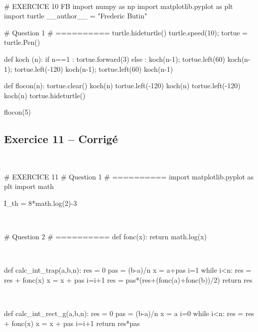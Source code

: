 \documentclass[10pt,fleqn]{article} %
\begin{document}
\begin{corrige}
$\quad$
\begin{python}
# EXERCICE 10 FB
import numpy as np
import matplotlib.pyplot as plt
import turtle
__author__ = "Frederic Butin"

# Question 1 
# ==========
turtle.hideturtle()
turtle.speed(10);
tortue = turtle.Pen()

def koch (n):
    if n==1 : 
        tortue.forward(3)
    else : 
        koch(n-1);
        tortue.left(60)
        koch(n-1);
        tortue.left(-120)
        koch(n-1);
        tortue.left(60)
        koch(n-1)
        

def flocon(n):
    tortue.clear()
    koch(n)
    tortue.left(-120)
    koch(n)
    tortue.left(-120)
    koch(n)
    tortue.hideturtle()

flocon(5)
\end{python}
\end{corrige}



\subsection*{Exercice 11 -- Corrigé}

\begin{corrige}
$\quad$
\begin{python}
# EXERCICE 11
# Question 1 
# ==========
import matplotlib.pyplot as plt
import math

I_th = 8*math.log(2)-3
\end{python}
\end{corrige}

\begin{corrige}
$\quad$
\begin{python}
# Question 2
# ==========
def fonc(x):
    return math.log(x)
\end{python}
\end{corrige}


\begin{corrige}
$\quad$
\begin{python}    
def calc_int_trap(a,b,n):
    res = 0
    pas = (b-a)/n
    x = a+pas
    i=1
    while i<n:
        res = res + fonc(x)
        x = x + pas
        i=i+1
    res = pas*(res+(fonc(a)+fonc(b))/2)
    return res
\end{python}
\end{corrige}


\begin{corrige}
$\quad$
\begin{python}    
def calc_int_rect_g(a,b,n):
    res = 0
    pas = (b-a)/n
    x = a
    i=0
    while i<n:
        res = res + fonc(x)
        x = x + pas
        i=i+1
    return res*pas
\end{python}
\end{corrige}
\end{document}
